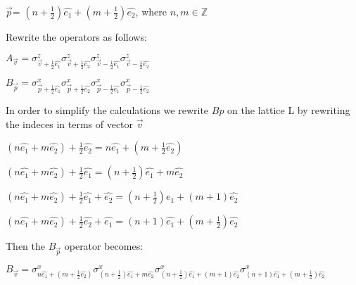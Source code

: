 \documentclass[12pt]{report}
\begin{document}
\begin{minipage}{1\textwidth}
\begin{center}
			$\vec{p}$= $(n + \frac{1}{2}) \hat{e_1} + (m + \frac{1}{2}) \hat{e_2}$, where $n,m \in \mathbb{Z}$\newline
		\end{center}
		
		Rewrite the operators as follows:\newline
		
		\begin{center}
			
			$A_{\vec{v}} = \sigma^z_{\vec{v}+\frac{1}{2}\hat{e_1}} \sigma^z_{\vec{v}+\frac{1}{2}\hat{e_2}} \sigma^z_{\vec{v}-\frac{1}{2}\hat{e_1}} \sigma^z_{\vec{v}-\frac{1}{2}\hat{e_2}}$ \newline
			
			$B_{\vec{p}} = \sigma^x_{\vec{p}+\frac{1}{2}\hat{e_1}} \sigma^x_{\vec{p}+\frac{1}{2}\hat{e_2}} \sigma^x_{\vec{p}-\frac{1}{2}\hat{e_1}} \sigma^x_{\vec{p}-\frac{1}{2}\hat{e_2}}$\newline
			
		\end{center}
		
		In order to simplify the calculations we rewrite $Bp$ on the lattice L by rewriting the indeces in terms of vector $\vec{v}$
		
		\begin{center}
			$(n\hat{e_1} + m\hat{e_2}) + \frac{1}{2}\hat{e_2}= n\hat{e_1} + (m+\frac{1}{2}\hat{e_2})$\newline
			
			$(n\hat{e_1} + m\hat{e_2}) + \frac{1}{2}\hat{e_1}= (n+ \frac{1}{2})\hat{e_1} + m\hat{e_2}$\newline
			
			$(n\hat{e_1} + m\hat{e_2}) + \frac{1}{2}\hat{e_1}+\hat{e_2}= (n+ \frac{1}{2})\hat{e_1} + (m + 1)\hat{e_2}$\newline
			
			$(n\hat{e_1} + m\hat{e_2}) + \frac{1}{2}\hat{e_2}+\hat{e_1}= (n+ 1)\hat{e_1} + (m + \frac{1}{2})\hat{e_2}$\newline
		\end{center}
		
		Then the $B_{\vec{p}}$ operator becomes:
		
		\begin{center}
			
			$B_{\vec{v}} = \sigma^x_{n\hat{e_1} + (m+\frac{1}{2}\hat{e_2})} \sigma^x_{(n+ \frac{1}{2})\hat{e_1} + m\hat{e_2}} \sigma^x_{(n+ \frac{1}{2})\hat{e_1} + (m + 1)\hat{e_2}} \sigma^x_{(n+ 1)\hat{e_1} + (m + \frac{1}{2})\hat{e_2}}$\newline
			

\end{center}
\end{minipage}
\end{document}
